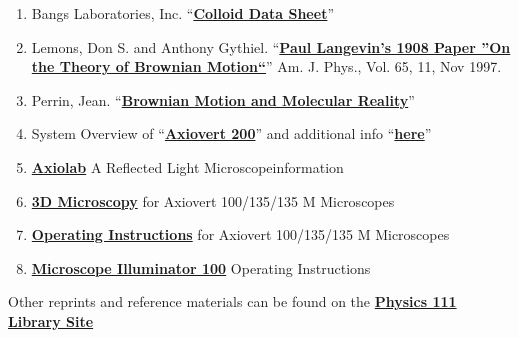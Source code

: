 \documentclass{../lab}
\begin{document}
\begin{enumerate}
    \item Bangs Laboratories, Inc. ``\href{http://physics111.lib.berkeley.edu/Physics111/Reprints/BMC/Colloid\%20Data\%20Sheets.pdf}{\textbf{Colloid Data Sheet}}''

    \item Lemons, Don S. and Anthony Gythiel. ``\href{http://physics111.lib.berkeley.edu/Physics111/Reprints/BMC/Langevin_On\%20the\%20Theory\%20of\%20Brownian\%20Motion.pdf}{\textbf{Paul Langevin's 1908 Paper ''On the Theory of Brownian Motion``}}'' Am. J. Phys., Vol. 65, 11, Nov 1997.

    \item Perrin, Jean. ``\href{http://physics111.lib.berkeley.edu/Physics111/Reprints/BMC/BMC\_Reprints/Perrin\_Experiment.pdf}{\textbf{Brownian Motion and Molecular Reality}}''

    \item System Overview of ``\href{http://physics111.lib.berkeley.edu/Physics111/Reprints/BMC/BMC\_Reprints/Systemoverview\_Axiovert\_200\_MAT\_46-0015\_e.pdf}{\textbf{Axiovert 200}}'' and additional info ``\href{http://physics111.lib.berkeley.edu/Physics111/Reprints/BMC/BMC\_Reprints/Zeiss-Microscope\_46-0015\_e.pdf}{\textbf{here}}''

    \item \href{http://physics111.lib.berkeley.edu/Physics111/Reprints/BMC/Zeiss-Microscope\_46-0015\_e.pdf}{\textbf{Axiolab}} A Reflected Light Microscope\href{http://physics111.lib.berkeley.edu/Physics111/Reprints/BMC/Zeiss-Microscope\_46-0015\_e.pdf}{\textbf{}}information

    \item \href{http://physics111.lib.berkeley.edu/Physics111/Reprints/BMC/b-40-022-43dmicroscopyaxiovert100135135m.pdf}{\textbf{3D Microscopy}} for Axiovert 100/135/135 M Microscopes

    \item \href{http://physics111.lib.berkeley.edu/Physics111/Reprints/BMC/BMC\_Reprints/g-42-513-axiovert100.pdf}{\textbf{Operating Instructions}} for Axiovert 100/135/135 M Microscopes

    \item \href{http://physics111.lib.berkeley.edu/Physics111/Reprints/BMC/BMC\_Reprints/microscope-illuminator100-g-41-310.pdf}{\textbf{Microscope Illuminator 100}} Operating Instructions
\end{enumerate}

Other reprints and reference materials can be found on the \href{http://physics111.lib.berkeley.edu/Physics111/Reprints/BMC/BMC\_index.html}{\textbf{Physics 111 Library Site}}
\end{document}
